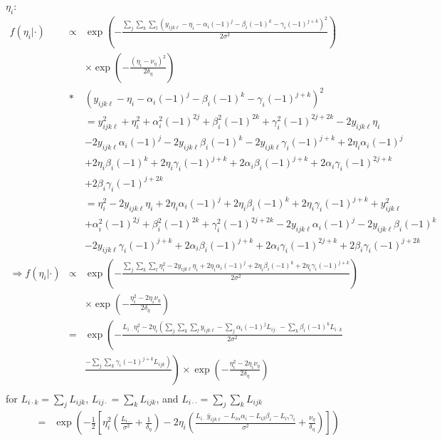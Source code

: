 $\eta_i$:
\begin{eqnarray*}
f(\eta_i|\cdot)&\propto&\exp\left(-\frac{\sum_j\sum_k\sum_l\left(y_{ijk\ell}-\eta_i-\alpha_i\left(-1\right)^{j}-\beta_i\left(-1\right)^{k}-\gamma_i\left(-1\right)^{j+k}\right)^2}{2\sigma^2}\right)\\
&&\times\exp\left(-\frac{\left(\eta_i-\nu_{\eta}\right)^2}{2\delta_{\eta}}\right)\\
&*&\left(y_{ijk\ell}-\eta_i-\alpha_i\left(-1\right)^{j}-\beta_i\left(-1\right)^{k}-\gamma_i\left(-1\right)^{j+k}\right)^2\\
&&=y_{ijk\ell}^2+\eta_i^2+\alpha_i^2(-1)^{2j}+\beta_i^2(-1)^{2k}+\gamma_i^2(-1)^{2j+2k}-2y_{ijk\ell}\eta_i\\
&&-2y_{ijk\ell}\alpha_i(-1)^j-2y_{ijk\ell}\beta_i(-1)^k-2y_{ijk\ell}\gamma_i(-1)^{j+k}+2\eta_i\alpha_i(-1)^j\\
&&+2\eta_i\beta_i(-1)^k+2\eta_i\gamma_i(-1)^{j+k}+2\alpha_i\beta_i(-1)^{j+k}+2\alpha_i\gamma_i(-1)^{2j+k}\\
&&+2\beta_i\gamma_i(-1)^{j+2k}\\
&&=\eta_i^2-2y_{ijk\ell}\eta_i+2\eta_i\alpha_i(-1)^j+2\eta_i\beta_i(-1)^k+2\eta_i\gamma_i(-1)^{j+k}+y_{ijk\ell}^2\\
&&+\alpha_i^2(-1)^{2j}+\beta_i^2(-1)^{2k}+\gamma_i^2(-1)^{2j+2k}-2y_{ijk\ell}\alpha_i(-1)^j-2y_{ijk\ell}\beta_i(-1)^k\\
&&-2y_{ijk\ell}\gamma_i(-1)^{j+k}+2\alpha_i\beta_i(-1)^{j+k}+2\alpha_i\gamma_i(-1)^{2j+k}+2\beta_i\gamma_i(-1)^{j+2k}\\
\Rightarrow f(\eta_i|\cdot)&\propto&\exp\left(-\frac{\sum_j\sum_k\sum_l\eta_i^2-2y_{ijk\ell}\eta_i+2\eta_i\alpha_i(-1)^j+2\eta_i\beta_i(-1)^k+2\eta_i\gamma_i(-1)^{j+k}}{2\sigma^2}\right)\\
&&\times\exp\left(-\frac{\eta_i^2-2\eta_i\nu_{\eta}}{2\delta_{\eta}}\right)\\
&=&\exp\left(-\frac{L_{i\cdot\cdot}\eta_i^2-2\eta_i\left(\sum_j\sum_k\sum_ly_{ijk\ell}-\sum_j\alpha_i(-1)^jL_{ij\cdot}-\sum_k\beta_i(-1)^kL_{i\cdot k}\right.}{2\sigma^2}\right.\\
&&\left.\frac{\left.-\sum_j\sum_k\gamma_i(-1)^{j+k}L_{ijk}\right)}{}\right)\times\exp\left(-\frac{\eta_i^2-2\eta_i\nu_{\eta}}{2\delta_{\eta}}\right)\\
\end{eqnarray*}
for $L_{i\cdot k} = \sum_jL_{ijk}$, $L_{ij\cdot} = \sum_kL_{ijk}$, and $L_{i\cdot\cdot} = \sum_j\sum_kL_{ijk}$\\
\begin{eqnarray*}
&=&\exp\left(-\frac{1}{2}\left[\eta_i^2\left(\frac{L_{i\cdot\cdot}}{\sigma^2}+\frac{1}{\delta_{\eta}}\right)-2\eta_i\left(\frac{L_{i\cdot\cdot}\bar{y}_{ijk\ell}-L_{i\alpha}\alpha_i-L_{i\beta}\beta_i-L_{i\gamma}\gamma_i}{\sigma^2}+\frac{\nu_{\eta}}{\delta_{\eta}}\right)\right]\right)\\
\end{eqnarray*}
